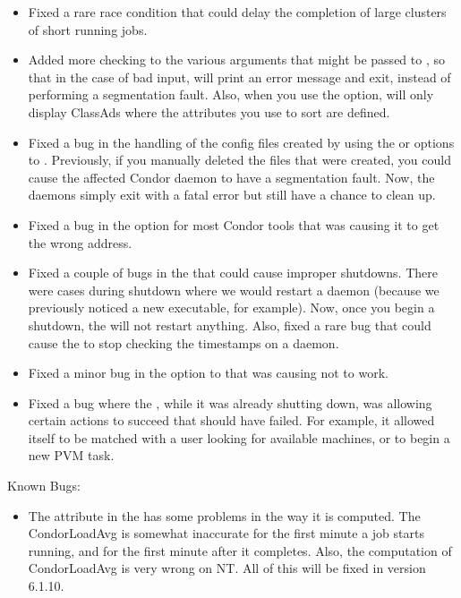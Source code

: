 \begin{itemize}
\item Fixed a rare race condition that could delay the completion of
large clusters of short running jobs. 

\item Added more checking to the various arguments that might be
passed to , so that in the case of bad input,
 will print an error message and exit, instead of
performing a segmentation fault.
Also, when you use the  option,  will only
display ClassAds where the attributes you use to sort are defined.

\item Fixed a bug in the handling of the config files created by
using the  or  options to .
Previously, if you manually deleted the files that were created, you
could cause the affected Condor daemon to have a segmentation fault.
Now, the daemons simply exit with a fatal error but still have a
chance to clean up.

\item Fixed a bug in the  option for most Condor
tools that was causing it to get the wrong address.

\item Fixed a couple of bugs in the  that could cause
improper shutdowns. 
There were cases during shutdown where we would restart a daemon
(because we previously noticed a new executable, for example).
Now, once you begin a shutdown, the  will not restart
anything. 
Also, fixed a rare bug that could cause the  to stop
checking the timestamps on a daemon.

\item Fixed a minor bug in the  option to
 that was causing  not to work.

\item Fixed a bug where the , while it was already
shutting down, was allowing certain actions to succeed that should
have failed.
For example, it allowed itself to be matched with a user looking for
available machines, or to begin a new PVM task.

\end{itemize}

\noindent Known Bugs:

\begin{itemize}

\item The  attribute in the  has
some problems in the way it is computed.
The CondorLoadAvg is somewhat inaccurate for the first minute a job
starts running, and for the first minute after it completes.
Also, the computation of CondorLoadAvg is very wrong on NT.
All of this will be fixed in version 6.1.10.

\end{itemize}


